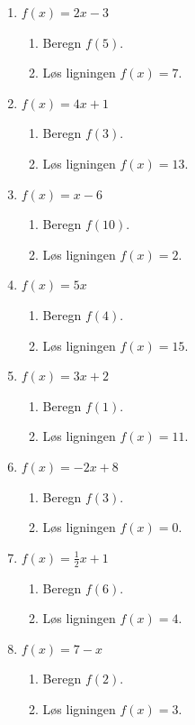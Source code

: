 \documentclass[10pt,a4paper,table]{article}
\begin{document}
\begin{enumerate}
  \item $f(x) = 2x - 3$
  \begin{enumerate}
    \item Beregn $f(5)$.
    \item Løs ligningen $f(x)=7$.
  \end{enumerate}

  \item $f(x) = 4x + 1$
  \begin{enumerate}
    \item Beregn $f(3)$.
    \item Løs ligningen $f(x)=13$.
  \end{enumerate}

  \item $f(x) = x - 6$
  \begin{enumerate}
    \item Beregn $f(10)$.
    \item Løs ligningen $f(x)=2$.
  \end{enumerate}

  \item $f(x) = 5x$
  \begin{enumerate}
    \item Beregn $f(4)$.
    \item Løs ligningen $f(x)=15$.
  \end{enumerate}

  \item $f(x) = 3x + 2$
  \begin{enumerate}
    \item Beregn $f(1)$.
    \item Løs ligningen $f(x)=11$.
  \end{enumerate}

  \item $f(x) = -2x + 8$
  \begin{enumerate}
    \item Beregn $f(3)$.
    \item Løs ligningen $f(x)=0$.
  \end{enumerate}

  \item $f(x) = \frac12 x + 1$
  \begin{enumerate}
    \item Beregn $f(6)$.
    \item Løs ligningen $f(x)=4$.
  \end{enumerate}

  \item $f(x) = 7 - x$
  \begin{enumerate}
    \item Beregn $f(2)$.
    \item Løs ligningen $f(x)=3$.
  \end{enumerate}


\end{enumerate}
\end{document}
